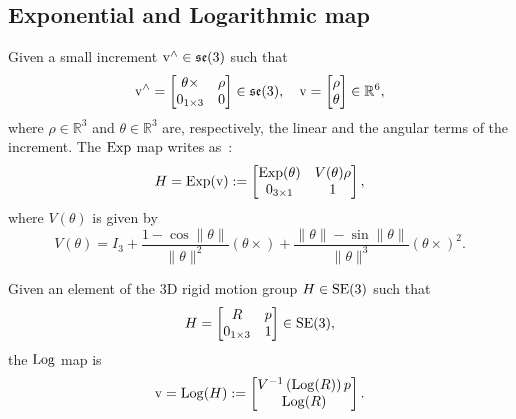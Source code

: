 \subsection{Exponential and Logarithmic map}
Given a small increment $\mathrm{v}^\wedge \in \mathfrak{se}(3)$ such that
\begin{equation}
\mathrm{v}^\wedge = \begin{bmatrix}
   \theta \times & \rho \\
   0_{1\times3} & 0
\end{bmatrix} \in \mathfrak{se}(3),
\quad 
\mathrm{v}= \begin{bmatrix}
   \rho \\
   \theta
\end{bmatrix} \in \mathbb{R}^6,
\end{equation} 
where $\rho\in\mathbb{R}^3$ and $\theta\in\mathbb{R}^3$ are, respectively, the linear and the angular terms of the increment.
The $\operatorname{Exp}$ map writes as~\citep{Sola2018ARobotics}:
\begin{equation}
    H = \operatorname{Exp}(\mathrm{v}) := \begin{bmatrix}
       \operatorname{Exp}(\theta) & V(\theta) \rho \\
       0_{3\times1} & 1
    \end{bmatrix},
\end{equation}
where $V(\theta)$ is given by
\begin{equation}
    V(\theta) =  I_3 + \frac{1 - \cos{\| \theta \|}}{\| \theta \| ^2} (\theta \times) + \frac{\| \theta \| - \sin{\| \theta \|}}{\| \theta \| ^3} (\theta \times) ^2.
\end{equation}

Given an element of the 3D rigid motion group $H \in {\mathrm{SE}}(3)$ such that
\begin{equation}
H = \begin{bmatrix}
   R & p \\
   0_{1\times3} & 1
\end{bmatrix} \in {\mathrm{SE}}(3),
\end{equation} 
the $\operatorname{Log}$ map is
\begin{equation}
    \mathrm{v}= \operatorname{Log}(H) := 
    \begin{bmatrix}
       V^{-1}\left(\operatorname{Log}(R)\right) p \\
       \operatorname{Log}(R)
    \end{bmatrix}.
\end{equation}


